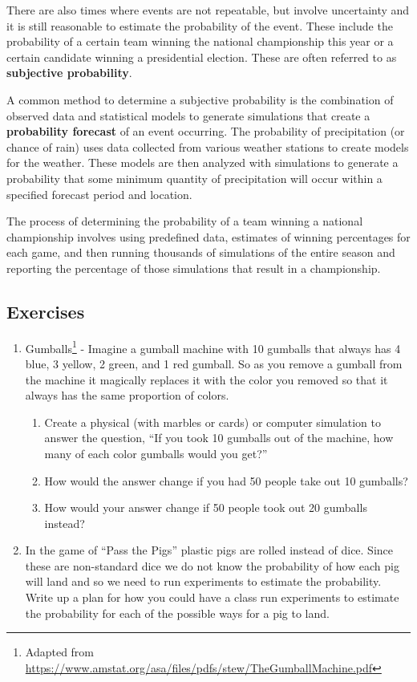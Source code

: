 \documentclass[
]{book}
\providecommand{\tightlist}{%
  \setlength{\itemsep}{0pt}\setlength{\parskip}{0pt}}
\theoremstyle{definition}
\theoremstyle{definition}
\theoremstyle{definition}
\theoremstyle{definition}
\theoremstyle{remark}
\begin{document}
There are also times where events are not repeatable, but involve uncertainty and it is still reasonable to estimate the probability of the event. These include the probability of a certain team winning the national championship this year or a certain candidate winning a presidential election. These are often referred to as \textbf{subjective probability}.

A common method to determine a subjective probability is the combination of observed data and statistical models to generate simulations that create a \textbf{probability forecast} of an event occurring. The probability of precipitation (or chance of rain) uses data collected from various weather stations to create models for the weather. These models are then analyzed with simulations to generate a probability that some minimum quantity of precipitation will occur within a specified forecast period and location.

The process of determining the probability of a team winning a national championship involves using predefined data, estimates of winning percentages for each game, and then running thousands of simulations of the entire season and reporting the percentage of those simulations that result in a championship.

\hypertarget{exercises-65}{%
\subsection{Exercises}\label{exercises-65}}

\begin{enumerate}
\def\labelenumi{\arabic{enumi}.}
\item
  Gumballs\footnote{Adapted from \url{https://www.amstat.org/asa/files/pdfs/stew/TheGumballMachine.pdf}} - Imagine a gumball machine with 10 gumballs that always has 4 blue, 3 yellow, 2 green, and 1 red gumball. So as you remove a gumball from the machine it magically replaces it with the color you removed so that it always has the same proportion of colors.

  \begin{enumerate}
  \def\labelenumii{\alph{enumii}.}
  \tightlist
  \item
    Create a physical (with marbles or cards) or computer simulation to answer the question, ``If you took 10 gumballs out of the machine, how many of each color gumballs would you get?''
  \item
    How would the answer change if you had 50 people take out 10 gumballs?
  \item
    How would your answer change if 50 people took out 20 gumballs instead?
  \end{enumerate}
\item
  In the game of ``Pass the Pigs'' plastic pigs are rolled instead of dice. Since these are non-standard dice we do not know the probability of how each pig will land and so we need to run experiments to estimate the probability. Write up a plan for how you could have a class run experiments to estimate the probability for each of the possible ways for a pig to land.
\end{enumerate}
\end{document}
